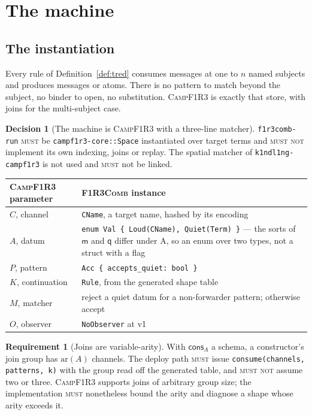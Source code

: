 \documentclass[11pt,a4paper]{article}
\newcommand{\code}[1]{\texttt{#1}}
\newcommand{\Comb}{\textsc{F1R3Comb}}
\newcommand{\Camp}{\textsc{CampF1R3}}
\newcommand{\MUST}{\textsc{must}}
\newcommand{\MUSTNOT}{\textsc{must not}}
\newcommand{\mm}{\mathsf{m}}
\newcommand{\qq}{\mathsf{q}}
\newcommand{\cons}{\mathsf{cons}}
\theoremstyle{definition}
\newtheorem{requirement}[definition]{Requirement}
\newtheorem{decision}[definition]{Decision}
\theoremstyle{plain}
\begin{document}
\section{The machine}\label{sec:runtime}

\subsection{The instantiation}

Every rule of Definition~\ref{def:tred} consumes messages at one to $n$ named
subjects and produces messages or atoms. There is no pattern to match beyond
the subject, no binder to open, no substitution. \Camp{} is exactly that
store, with joins for the multi-subject case.

\begin{decision}[The machine is \Camp{} with a three-line matcher]
\label{dec:machine}
\code{f1r3comb-run} \MUST{} be \code{campf1r3-core::Space} instantiated over
target terms and \MUSTNOT{} implement its own indexing, joins or replay. The
spatial matcher of \code{k1ndl1ng-campf1r3} is not used and \MUST{} not be
linked.
\end{decision}

\begin{center}
\begin{tabularx}{\linewidth}{@{}l>{\raggedright\arraybackslash}X@{}}
\toprule
\Camp{} parameter & \Comb{} instance\\
\midrule
$C$, channel & \code{CName}, a target name, hashed by its encoding\\
$A$, datum & \code{enum Val \{ Loud(CName), Quiet(Term) \}} --- the sorts of
$\mm$ and $\qq$ differ under A, so an enum over two types, not a struct with a
flag\\
$P$, pattern & \code{Acc \{ accepts\_quiet: bool \}}\\
$K$, continuation & \code{Rule}, from the generated shape table\\
$M$, matcher & reject a quiet datum for a non-forwarder pattern; otherwise
accept\\
$O$, observer & \code{NoObserver} at v1\\
\bottomrule
\end{tabularx}
\end{center}

\begin{requirement}[Joins are variable-arity]\label{req:joins}
With $\cons_{A}$ a schema, a constructor's join group has $\mathrm{ar}(A)$
channels. The deploy path \MUST{} issue
\code{consume(channels, patterns, k)} with the group read off the generated
table, and \MUSTNOT{} assume two or three. \Camp{} supports joins of arbitrary
group size; the implementation \MUST{} nonetheless bound the arity and
diagnose a shape whose arity exceeds it.
\end{requirement}
\end{document}

